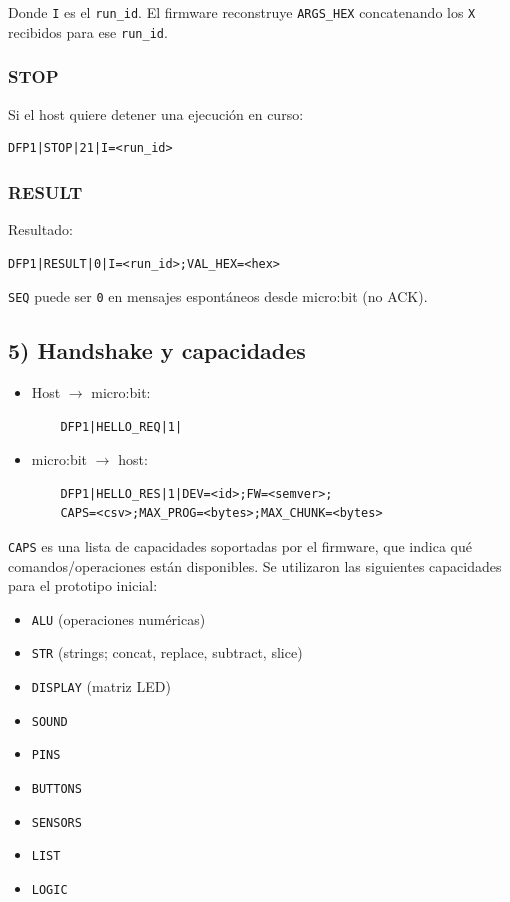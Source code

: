 Donde \texttt{I} es el \texttt{run\_id}. El firmware reconstruye \texttt{ARGS\_HEX} concatenando los \texttt{X} recibidos para ese \texttt{run\_id}.

\subsubsection*{STOP}

Si el host quiere detener una ejecución en curso:
\begin{verbatim}
DFP1|STOP|21|I=<run_id>
\end{verbatim}

\subsubsection*{RESULT}

Resultado:
\begin{verbatim}
DFP1|RESULT|0|I=<run_id>;VAL_HEX=<hex>
\end{verbatim}


\texttt{SEQ} puede ser \texttt{0} en mensajes espontáneos desde micro:bit (no ACK).

\subsection*{5) Handshake y capacidades}

\begin{itemize}
    \item Host $\rightarrow$ micro:bit:
          \begin{verbatim}
    DFP1|HELLO_REQ|1|
    \end{verbatim}

    \item micro:bit $\rightarrow$ host:
          \begin{verbatim}
    DFP1|HELLO_RES|1|DEV=<id>;FW=<semver>;
    CAPS=<csv>;MAX_PROG=<bytes>;MAX_CHUNK=<bytes>
    \end{verbatim}
\end{itemize}

\texttt{CAPS} es una lista de capacidades soportadas por el firmware, que indica qué comandos/operaciones están disponibles. Se utilizaron las siguientes capacidades para el prototipo inicial:
\begin{itemize}
    \item \texttt{ALU} (operaciones numéricas)
    \item \texttt{STR} (strings; concat, replace, subtract, slice)
    \item \texttt{DISPLAY} (matriz LED)
    \item \texttt{SOUND}
    \item \texttt{PINS}
    \item \texttt{BUTTONS}
    \item \texttt{SENSORS}
    \item \texttt{LIST}
    \item \texttt{LOGIC}
\end{itemize}


